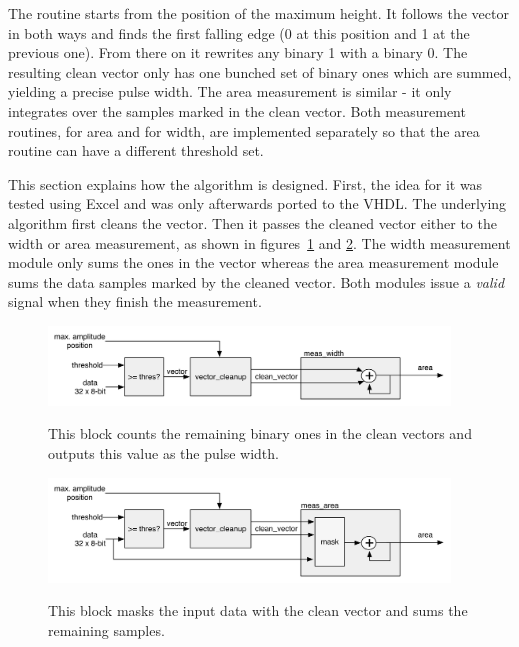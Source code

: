 The routine starts from the position of the maximum height. It follows the vector in both ways and finds the first falling edge (0 at this position and 1 at the previous one). From there on it rewrites any binary 1 with a binary 0. The resulting clean vector only has one bunched set of binary ones which are summed, yielding a precise pulse width. The area measurement is similar - it only integrates over the samples marked in the clean vector. Both measurement routines, for area and for width, are implemented separately so that the area routine can have a different threshold set.

This section explains how the algorithm is designed. First, the idea for it was tested using Excel and was only afterwards ported to the VHDL. The underlying algorithm first cleans the vector. Then it passes the cleaned vector either to the width or area measurement, as shown in figures~\ref{fig:width} and \ref{fig:area}. The width measurement module only sums the ones in the vector whereas the area measurement module sums the data samples marked by the cleaned vector. Both modules issue a \emph{valid} signal when they finish the measurement.

\begin{figure}[!t]
\centering
\includegraphics[width=0.95\textwidth]{05_current_monitoring/plots/width2}  \label{fig:width}
\caption{This block counts the remaining binary ones in the clean vectors and outputs this value as the pulse width.}
\end{figure}


\begin{figure}[!t]
\centering\includegraphics[width=0.95\textwidth]{05_current_monitoring/plots/area2}  \label{fig:area}
\caption{This block masks the input data with the clean vector and sums the remaining samples.}
\end{figure}


